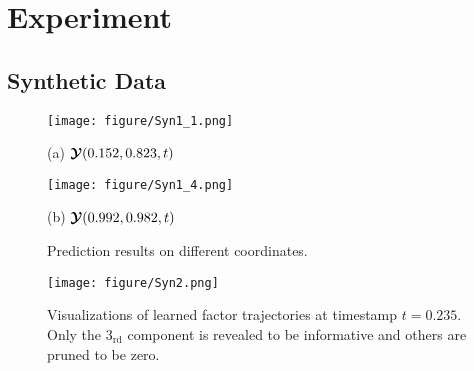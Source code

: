 
\section{Experiment}
\subsection{Synthetic Data}
\label{syt_data}
\begin{figure}[t]
    \centering
    \begin{minipage}{0.242\textwidth}
        \centering
        \texttt{[image: figure/Syn1\_1.png]}
        \caption*{(a) $\mbox{\boldmath $\mathcal{Y}$}(0.152, 0.823,  t)$}
    \end{minipage}
    \hspace{-0.22cm} %
    \begin{minipage}{0.242\textwidth}
        \centering
        \texttt{[image: figure/Syn1\_4.png]}
        \caption*{(b) $\mbox{\boldmath $\mathcal{Y}$}(0.992, 0.982,  t)$}
    \end{minipage}
    
    \caption{Prediction results on different coordinates.}
    \label{fig:syn1}
    \vspace{-0.05in}
\end{figure}

\begin{figure}[htb]
    \centering
    \texttt{[image: figure/Syn2.png]}
    \caption{Visualizations of learned factor trajectories at timestamp $t=0.235$. Only the $3_{\text{rd}}$ component is revealed to be informative and others are pruned to be zero.}
    \label{fig:s2}
    \vspace{-0.05in}
\end{figure}





